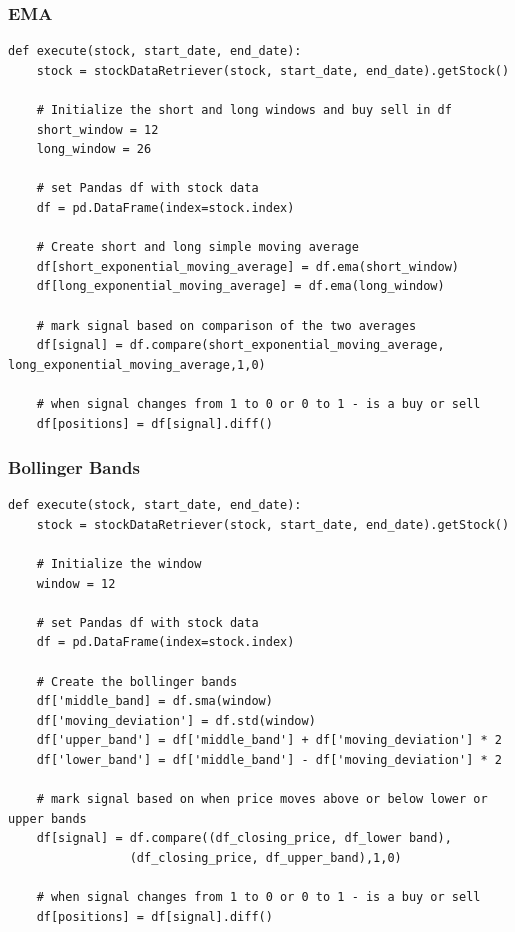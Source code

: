 \documentclass[letterpaper,11pt]{article}
\begin{document}
\subsubsection{EMA }

\begin{verbatim}
def execute(stock, start_date, end_date):
    stock = stockDataRetriever(stock, start_date, end_date).getStock()

    # Initialize the short and long windows and buy sell in df
    short_window = 12
    long_window = 26

    # set Pandas df with stock data
    df = pd.DataFrame(index=stock.index)

    # Create short and long simple moving average
    df[short_exponential_moving_average] = df.ema(short_window)
    df[long_exponential_moving_average] = df.ema(long_window)

    # mark signal based on comparison of the two averages
    df[signal] = df.compare(short_exponential_moving_average, long_exponential_moving_average,1,0)

    # when signal changes from 1 to 0 or 0 to 1 - is a buy or sell
    df[positions] = df[signal].diff()

\end{verbatim}

\subsubsection{Bollinger Bands }

\begin{verbatim}
def execute(stock, start_date, end_date):
    stock = stockDataRetriever(stock, start_date, end_date).getStock()

    # Initialize the window
    window = 12

    # set Pandas df with stock data
    df = pd.DataFrame(index=stock.index)

    # Create the bollinger bands
    df['middle_band] = df.sma(window)
    df['moving_deviation'] = df.std(window)
    df['upper_band'] = df['middle_band'] + df['moving_deviation'] * 2
    df['lower_band'] = df['middle_band'] - df['moving_deviation'] * 2

    # mark signal based on when price moves above or below lower or upper bands
    df[signal] = df.compare((df_closing_price, df_lower band), 
    		     (df_closing_price, df_upper_band),1,0)

    # when signal changes from 1 to 0 or 0 to 1 - is a buy or sell
    df[positions] = df[signal].diff()

\end{verbatim}
\end{document}
